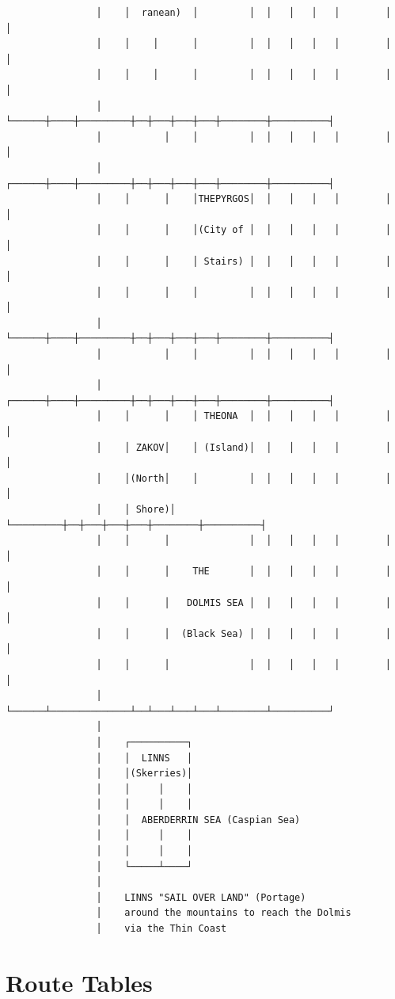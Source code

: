 \documentclass[11pt,letterpaper,twoside]{book}
\begin{document}
\begin{verbatim}
                │    │  ranean)  │         │  │   │   │   │        │          │
                │    │    │      │         │  │   │   │   │        │          │
                │    │    │      │         │  │   │   │   │        │          │
                │    └──────┼────┼─────────┼──┼───┼───┼───┼────────┼──────────┤
                │           │    │         │  │   │   │   │        │          │
                │    ┌──────┼────┼─────────┼──┼───┼───┼───┼────────┼──────────┤
                │    │      │    │THEPYRGOS│  │   │   │   │        │          │
                │    │      │    │(City of │  │   │   │   │        │          │
                │    │      │    │ Stairs) │  │   │   │   │        │          │
                │    │      │    │         │  │   │   │   │        │          │
                │    └──────┼────┼─────────┼──┼───┼───┼───┼────────┼──────────┤
                │           │    │         │  │   │   │   │        │          │
                │    ┌──────┼────┼─────────┼──┼───┼───┼───┼────────┼──────────┤
                │    │      │    │ THEONA  │  │   │   │   │        │          │
                │    │ ZAKOV│    │ (Island)│  │   │   │   │        │          │
                │    │(North│    │         │  │   │   │   │        │          │
                │    │ Shore)│   └─────────┼──┼───┼───┼───┼────────┼──────────┤
                │    │      │              │  │   │   │   │        │          │
                │    │      │    THE       │  │   │   │   │        │          │
                │    │      │   DOLMIS SEA │  │   │   │   │        │          │
                │    │      │  (Black Sea) │  │   │   │   │        │          │
                │    │      │              │  │   │   │   │        │          │
                │    └──────┴──────────────┴──┴───┴───┴───┴────────┴──────────┘
                │
                │    ┌──────────┐
                │    │  LINNS   │
                │    │(Skerries)│
                │    │     │    │
                │    │     │    │
                │    │  ABERDERRIN SEA (Caspian Sea)
                │    │     │    │
                │    │     │    │
                │    └─────┴────┘
                │
                │    LINNS "SAIL OVER LAND" (Portage)
                │    around the mountains to reach the Dolmis
                │    via the Thin Coast
\end{verbatim}

\section{Route Tables}
\end{document}
